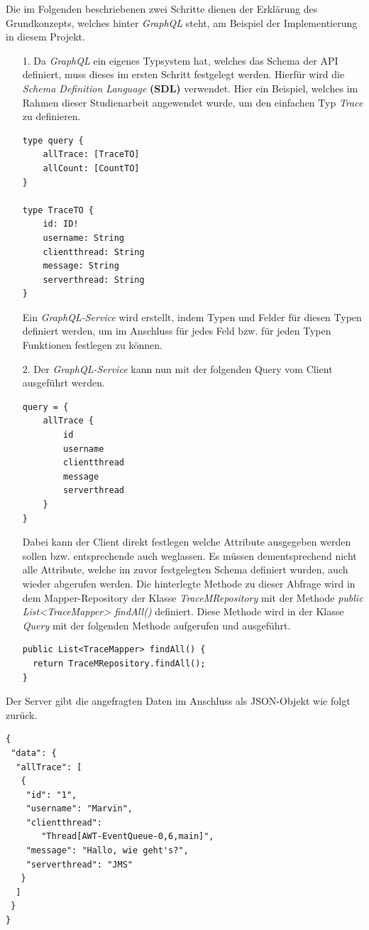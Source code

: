 \documentclass[10pt,journal,compsoc]{IEEEtran}
\begin{document}
Die im Folgenden beschriebenen zwei Schritte dienen der Erklärung des Grundkonzepts, welches hinter \textit{GraphQL} steht, am Beispiel der Implementierung in diesem Projekt.
\begin{itemize}
	\item[1.]
	Da \textit{GraphQL} ein eigenes Typsystem hat, welches das Schema der API definiert, muss dieses im ersten Schritt festgelegt werden. Hierfür wird die \textit{Schema Definition Language} \textbf{(SDL)} verwendet. Hier ein Beispiel, welches im Rahmen dieser Studienarbeit angewendet wurde, um den einfachen Typ \textit{Trace} zu definieren. 
	
\begin{lstlisting}
type query {
	allTrace: [TraceTO]
	allCount: [CountTO]
}

type TraceTO {	
	id: ID!
	username: String
	clientthread: String
	message: String
	serverthread: String
}
\end{lstlisting}
	Ein \textit{GraphQL-Service} wird erstellt, indem Typen und Felder für diesen Typen definiert werden, um im Anschluss für jedes Feld bzw. für jeden Typen Funktionen festlegen zu können.
	\item[2.]
	Der \textit{GraphQL-Service} kann nun mit der folgenden Query vom Client ausgeführt werden. \cite{GraphQL:howtoGraphQL}
\begin{lstlisting}
query = {
	allTrace {
		id
		username
		clientthread
		message
		serverthread
	}
}
\end{lstlisting}
	Dabei kann der Client direkt festlegen welche Attribute ausgegeben werden sollen bzw. entsprechende auch weglassen. Es müssen dementsprechend nicht alle Attribute, welche im zuvor festgelegten Schema definiert wurden, auch wieder abgerufen werden. Die hinterlegte Methode zu dieser Abfrage wird in dem Mapper-Repository der Klasse \textit{TraceMRepository} mit der Methode \textit{public List<TraceMapper> findAll()} definiert.  Diese Methode wird in der Klasse \textit{Query} mit der folgenden Methode aufgerufen und ausgeführt. \cite{GraphQL:howtoGraphQL}
\begin{lstlisting}
public List<TraceMapper> findAll() {
  return TraceMRepository.findAll();
}
\end{lstlisting}
	\end{itemize}
Der Server gibt die angefragten Daten im Anschluss als JSON-Objekt wie folgt zurück. 
\begin{lstlisting}
{
 "data": {
  "allTrace": [
   {
    "id": "1",
    "username": "Marvin",
    "clientthread": 
       "Thread[AWT-EventQueue-0,6,main]",
    "message": "Hallo, wie geht's?",
    "serverthread": "JMS"
   }
  ]
 }
}
\end{lstlisting}
\end{document}
